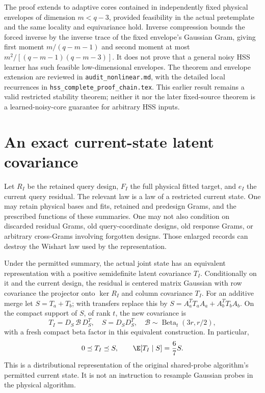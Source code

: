 \documentclass[11pt,oneside,openany,a4paper]{book}
\numberwithin{equation}{chapter}
\theoremstyle{definition}
\theoremstyle{remark}
\newcommand{\sourcefile}[1]{{\small\nolinkurl{#1}}}
\begin{document}
The proof extends to adaptive cores contained in independently fixed
physical envelopes of dimension $m<q-3$, provided feasibility in the
actual pretemplate and the same locality and equivariance hold.  Inverse
compression bounds the forced inverse by the inverse trace of the
fixed envelope's Gaussian Gram, giving first moment
$m/(q-m-1)$ and second moment at most
$m^2/[(q-m-1)(q-m-3)]$.  It does not prove that a general noisy HSS
learner has such feasible low-dimensional envelopes.  The theorem and
envelope extension are reviewed in \sourcefile{audit_nonlinear.md},
with the detailed local recurrences in
\sourcefile{hss_complete_proof_chain.tex}.  This earlier result remains
a valid restricted stability theorem; neither it nor the later
fixed-source theorem is a learned-noisy-core guarantee for arbitrary
HSS inputs.

\section{An exact current-state latent covariance}

Let $R_I$ be the retained query design, $F_I$ the full physical fitted
target, and $e_I$ the current query residual.  The relevant law is a
law of a restricted current state.  One may retain physical bases and
fits, retained and predesign Grams, and the prescribed functions of
these summaries.  One may not also condition on discarded residual
Grams, old query-coordinate designs, old response Grams, or arbitrary
cross-Grams involving forgotten designs.  Those enlarged records can
destroy the Wishart law used by the representation.

Under the permitted summary, the actual joint state has an equivalent
representation with a positive semidefinite latent covariance $T_I$.
Conditionally on it and the current design, the residual is centered
matrix Gaussian with row covariance the projector onto
$\ker R_I$ and column covariance $T_I$.  For an additive merge let
$S=T_a+T_b$; with transfers replace this by
$S=A_a^TT_aA_a+A_b^TT_bA_b$.  On the compact support of $S$, of rank $t$,
the new covariance is
\begin{equation}
 T_I=D_S\,\mathcal B\,D_S^T,
 \quad S=D_SD_S^T,
 \quad \mathcal B\sim\operatorname{Beta}_t(3r,r/2),
 \label{upd:eq:route-matrix-beta}
\end{equation}
with a fresh compact beta factor in this equivalent construction.
In particular,
\[
 0\preceq T_I\preceq S,\qquad
 \E[T_I\mid S]=\frac67S.
\]
This is a distributional representation of the original shared-probe
algorithm's permitted current state.  It is not an instruction to
resample Gaussian probes in the physical algorithm.
\end{document}
